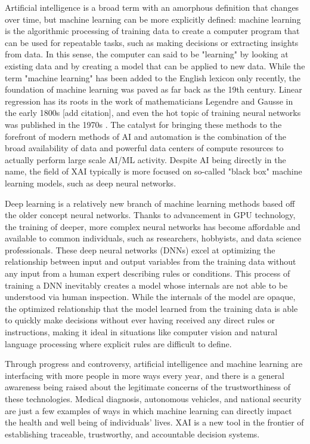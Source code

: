 \documentclass{IEEEtran}
\begin{document}
Artificial intelligence is a broad term with an amorphous definition that changes over time, but machine learning can be more explicitly defined: machine learning is the algorithmic processing of training data to create a computer program that can be used for repeatable tasks, such as making decisions or extracting insights from data.  In this sense, the computer can said to be "learning" by looking at existing data and by creating a model that can be applied to new data.  While the term "machine learning" has been added to the English lexicon only recently, the foundation of machine learning was paved as far back as the 19th century.  Linear regression has its roots in the work of mathematicians Legendre and Gausse in the early 1800s [add citation], and even the hot topic of training neural networks was published in the 1970s \cite{Werbos1974}.  The catalyst for bringing these methods to the forefront of modern methods of AI and automation is the combination of the broad availability of data and powerful data centers of compute resources to actually perform large scale AI/ML activity.  Despite AI being directly in the name, the field of XAI typically is more focused on so-called "black box" machine learning models, such as deep neural networks.

Deep learning is a relatively new branch of machine learning methods based off the older concept neural networks.  Thanks to advancement in GPU technology, the training of deeper, more complex neural networks has become affordable and available to common individuals, such as researchers, hobbyists, and data science professionals.  These deep neural networks (DNNs) excel at optimizing the relationship between input and output variables from the training data without any input from a human expert describing rules or conditions.  This process of training a DNN inevitably creates a model whose internals are not able to be  understood via human inspection.  While the internals of the model are opaque, the optimized relationship that the model learned from the training data is able to quickly make decisions without ever having received any direct rules or instructions, making it ideal in situations like computer vision and natural language processing where explicit rules are difficult to define.

Through progress and controversy, artificial intelligence and machine learning are interfacing with more people in more ways every year, and there is a general awareness being raised about the legitimate concerns of the trustworthiness of these technologies.  Medical diagnosis, autonomous vehicles, and national security are just a few examples of ways in which machine learning can directly impact the health and well being of individuals' lives.  XAI is a new tool in the frontier of establishing traceable, trustworthy, and accountable decision systems.
\end{document}
